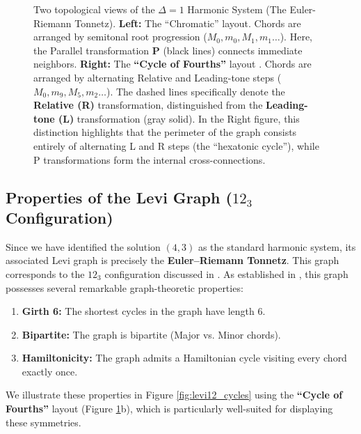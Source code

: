 \documentclass[12pt,letterpaper]{amsart}
\begin{document}
\begin{figure}[H]
    \caption{\scriptsize Two topological views of the $\Delta=1$ Harmonic System (The Euler-Riemann Tonnetz).
    \textbf{Left:} The ``Chromatic'' layout. Chords are arranged by semitonal root progression ($M_0, m_0, M_1, m_1 \dots$). Here, the Parallel transformation \textbf{P} (black lines) connects immediate neighbors.
    \textbf{Right:} The \textbf{``Cycle of Fourths''} layout \cite{lane}. Chords are arranged by alternating Relative and Leading-tone steps ($M_0, m_9, M_5, m_2 \dots$).
    The dashed lines specifically denote the \textbf{Relative (R)} transformation, distinguished from the \textbf{Leading-tone (L)} transformation (gray solid). In the Right figure, this distinction highlights that the perimeter of the graph consists entirely of alternating L and R steps (the ``hexatonic cycle''), while P transformations form the internal cross-connections.}
    \label{fig:levi12_combined}
\end{figure}
\subsection{Properties of the Levi Graph ($12_3$ Configuration)}
Since we have identified the solution $(4,3)$ as the standard harmonic system, its associated Levi graph is precisely the \textbf{Euler--Riemann Tonnetz}. This graph corresponds to the $12_3$ configuration discussed in \cite{lane}.
As established in \cite{lane}, this graph possesses several remarkable graph-theoretic properties:
\begin{enumerate}
    \item \textbf{Girth 6:} The shortest cycles in the graph have length 6.
    \item \textbf{Bipartite:} The graph is bipartite (Major vs. Minor chords).
    \item \textbf{Hamiltonicity:} The graph admits a Hamiltonian cycle visiting every chord exactly once.
\end{enumerate}

We illustrate these properties in Figure \ref{fig:levi12_cycles} using the \textbf{``Cycle of Fourths''} layout (Figure \ref{fig:levi12_combined}b), which is particularly well-suited for displaying these symmetries.
\end{document}
